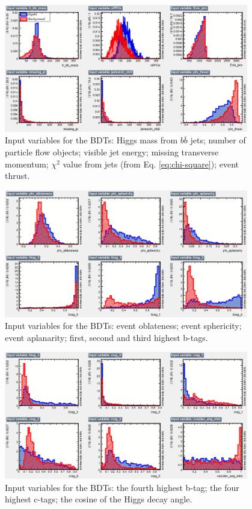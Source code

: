 \begin{figure}[p]
	\centering
	\includegraphics[width=0.95\textwidth]{../Pictures/Analysis/BDTs/variables_id_c1.eps}
	\caption{Input variables for the BDTs: Higgs mass from $b\overline{b}$ jets; number of particle flow objects; visible jet energy; missing transverse momentum; $\chi^2$ value from jets (from Eq. \ref{eq:chi-square}); event thrust.}
	\label{figure:analysis/results/tmva-inputs-1}
\end{figure}

\begin{figure}[p]
	\centering
	\includegraphics[width=0.95\textwidth]{../Pictures/Analysis/BDTs/variables_id_c2.eps}
	\caption{Input variables for the BDTs: event oblateness; event sphericity; event aplanarity; first, second and third highest b-tags.}
	\label{figure:analysis/results/tmva-inputs-2}
\end{figure}

\begin{figure}[p]
	\centering
	\includegraphics[width=0.95\textwidth]{../Pictures/Analysis/BDTs/variables_id_c3.eps}
	\caption{Input variables for the BDTs: the fourth highest b-tag; the four highest c-tags; the cosine of the Higgs decay angle.}
	\label{figure:analysis/results/tmva-inputs-3}
\end{figure}

